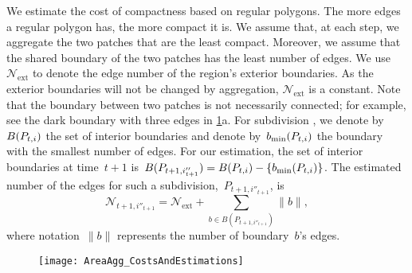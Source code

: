 We estimate the cost of compactness based on regular polygons.
The more edges a regular polygon has, the more compact it is.
We assume that, at each step, 
we aggregate the two patches that are the least compact.
Moreover, we assume that the shared boundary of the two patches  
has the least number of edges.
We use $\mathcal{N}_\mathrm{ext}$ to 
denote the edge number of the region's exterior boundaries.
As the exterior boundaries will not be changed by aggregation, 
$\mathcal{N}_\mathrm{ext}$ 
is a constant. 
%
Note that the boundary between two patches 
is not necessarily connected; 
for example, see the dark boundary with three edges 
in \fig\ref{fig:AreaAgg_h_comp}a.
For subdivision \Pnode,
we denote by~$B(P_{t,i})$ the set of interior boundaries 
and denote by~$b_\mathrm{min}(P_{t,i})$ 
the boundary with the smallest number of edges.
For our estimation, the set of interior boundaries 
at time~$t+1$ 
is~$B(P_{t+1,i''_{t+1}})= B(P_{t,i})-{\{b_\mathrm{min}(P_{t,i})\}}$. 
The estimated number of the edges for 
such a subdivision,~$P_{t+1,i''_{t+1}}$, is
\begin{equation}
\label{eq:LeftEdgeNum}
\mathcal{N}_{t+1,i''_{t+1}}=
\mathcal{N}_\mathrm{ext} + \sum_{b \in B(P_{t+1,i''_{t+1}})} \|b\|,
\end{equation}
where notation~$\|b\|$ represents the number of boundary~$b$'s edges.

\begin{figure*}[tb]
\centering
\texttt{[image: AreaAgg\_CostsAndEstimations]}
\label{fig:AreaAgg_h_comp}
\end{figure*}

